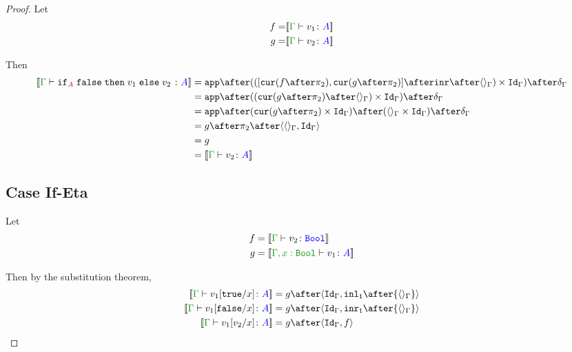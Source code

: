 \documentclass{report}
\begin{document}
\begin{framed}
\begin{proof}
        
        \case{\eqiffalse}
        Let
        \begin{align*}
            f = &\deno{\gtyperelation{v_1}{ A}}\\
            g = &\deno{\gtyperelation{v_2}{ A}}\\
        \end{align*}
        
        Then
        \begin{equation}
            \begin{split}
                \deno{\gtyperelation{\pifthenelse{A}{\f}{v_1}{v_2}}{ A}} & = \ifMorph{\inr\after\term{\G}}{f}{g} \\
                & = \app\after((\cur{g\after\pp}\after\term{\G})\times\idg)\after\diag{\G}\\
                & = \app\after(\cur{g\after\pp}\times\idg)\after(\term{\G}\times\idg)\after\diag{\G}\\
                & = g\after\pp\after\pr{\term{\G}}{\idg}\\
                & = g \\
                & = \deno{\gtyperelation{v_2}{ A}}\\
            \end{split}
        \end{equation}
        
        \subsection{Case If-Eta}
            Let 
            \begin{align*}
                f & = \deno{\typerelation{\G}{v_2}{\B}} \\
                g & = \deno{\typerelation{\G, x: \B}{v_1}{ A}} \\
            \end{align*}
        
        
            Then by the substitution theorem,
            \begin{align*}
                \deno{\typerelation{\G}{v_1\ssub{x}{\t}}{ A}} & = g\after\pr{\idg}{\inl_\1\after{\term{\G}}}\\
                \deno{\typerelation{\G}{v_1\ssub{x}{\f}}{ A}} & = g\after\pr{\idg}{\inr_\1\after{\term{\G}}}\\
                \deno{\gtyperelation{v_1\ssub{x}{v_2}}{ A}} & = g\after\pr{\idg}{f}
            \end{align*}
        

\end{proof}
\end{framed}
\end{document}
